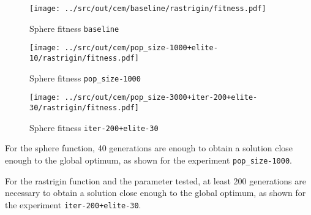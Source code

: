 \begin{figure}[H]
	\centering
	\begin{minipage}[b]{.6\textwidth}
		\texttt{[image: ../src/out/cem/baseline/rastrigin/fitness.pdf]}	
	\end{minipage}
	\caption{Sphere fitness \texttt{baseline}}
	\label{fig:cem-r-fitness/baseline}
\end{figure}
\begin{figure}[H]
	\centering
	\begin{minipage}[b]{.6\textwidth}
		\texttt{[image: ../src/out/cem/pop\_size-1000+elite-10/rastrigin/fitness.pdf]}	
	\end{minipage}
	\caption{Sphere fitness \texttt{pop\_size-1000}}
	\label{fig:cem-r-fitness/1000}
	
	\begin{minipage}[b]{.6\textwidth}
		\texttt{[image: ../src/out/cem/pop\_size-3000+iter-200+elite-30/rastrigin/fitness.pdf]}	
	\end{minipage}
	\caption{Sphere fitness \texttt{iter-200+elite-30}}
	\label{fig:cem-r-fitness/200}
\end{figure}


For the sphere function, 40 generations are enough to obtain a solution close enough to the global optimum, as shown for the experiment \texttt{pop\_size-1000}.

For the rastrigin function and the parameter tested, at least 200 generations are necessary to obtain a solution close enough to the global optimum, as shown for the experiment \texttt{iter-200+elite-30}.